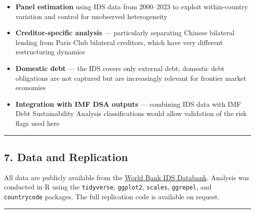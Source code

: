 \documentclass[
  letterpaper,
  DIV=11,
  numbers=noendperiod]{scrartcl}
\providecommand{\tightlist}{%
  \setlength{\itemsep}{0pt}\setlength{\parskip}{0pt}}\usepackage{longtable,booktabs,array}
\begin{document}
\begin{itemize}
\tightlist
\item
  \textbf{Panel estimation} using IDS data from 2000--2023 to exploit
  within-country variation and control for unobserved heterogeneity
\item
  \textbf{Creditor-specific analysis} --- particularly separating
  Chinese bilateral lending from Paris Club bilateral creditors, which
  have very different restructuring dynamics
\item
  \textbf{Domestic debt} --- the IDS covers only external debt; domestic
  debt obligations are not captured but are increasingly relevant for
  frontier market economies
\item
  \textbf{Integration with IMF DSA outputs} --- combining IDS data with
  IMF Debt Sustainability Analysis classifications would allow
  validation of the risk flags used here
\end{itemize}

\begin{center}\rule{0.5\linewidth}{0.5pt}\end{center}

\subsection{7. Data and Replication}\label{data-and-replication}

All data are publicly available from the
\href{https://databank.worldbank.org/source/international-debt-statistics}{World
Bank IDS Databank}. Analysis was conducted in R using the
\texttt{tidyverse}, \texttt{ggplot2}, \texttt{scales}, \texttt{ggrepel},
and \texttt{countrycode} packages. The full replication code is
available on request.

\begin{center}\rule{0.5\linewidth}{0.5pt}\end{center}
\end{document}
